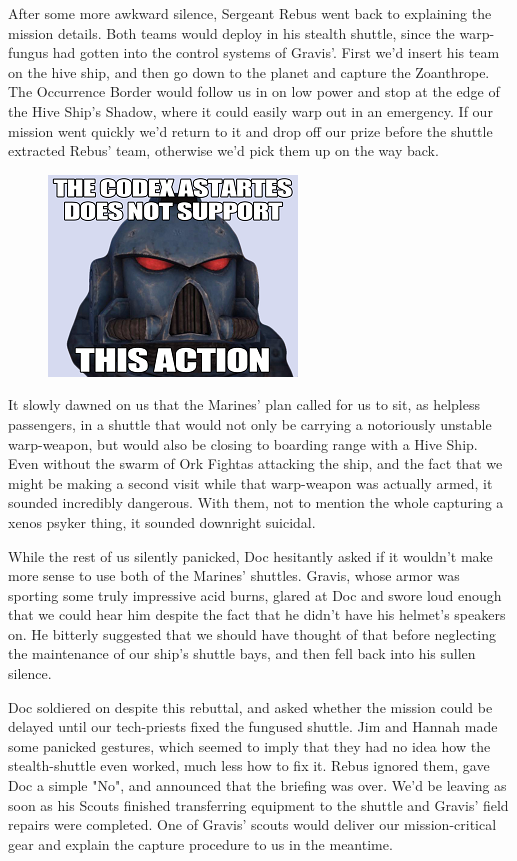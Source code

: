 After some more awkward silence, Sergeant Rebus went back to explaining the mission details. 
Both teams would deploy in his stealth shuttle, since the warp-fungus had gotten into the control systems of Gravis'. 
First we'd insert his team on the hive ship, and then go down to the planet and capture the Zoanthrope. 
The Occurrence Border would follow us in on low power and stop at the edge of the Hive Ship's Shadow, where it could easily warp out in an emergency. 
If our mission went quickly we'd return to it and drop off our prize before the shuttle extracted  Rebus' team, otherwise we'd pick them up on the way back.
\begin{figure}
	\begin{center}
		\includegraphics[width=\figwidth]{pics/12/22.png}
	\end{center}
\end{figure}
It slowly dawned on us that the Marines' plan called for us to sit, as helpless passengers, in a shuttle that would not only be carrying a notoriously unstable warp-weapon, but would also be closing to boarding range with a Hive Ship. 
Even without the swarm of Ork Fightas attacking the ship, and the fact that we might be making a second visit while that warp-weapon was actually armed, it sounded incredibly dangerous. 
With them, not to mention the whole capturing a xenos psyker thing, it sounded downright suicidal.

While the rest of us silently panicked, Doc hesitantly asked if it wouldn't make more sense to use both of the Marines' shuttles. 
Gravis, whose armor was sporting some truly impressive acid burns, glared at Doc and swore loud enough that we could hear him despite the fact that he didn't have his helmet's speakers on. 
He bitterly suggested that we should have thought of that before neglecting the maintenance of our ship's shuttle bays, and then fell back into his sullen silence. 


Doc soldiered on despite this rebuttal, and asked whether the mission could be delayed until our tech-priests fixed the fungused shuttle. 
Jim and Hannah made some panicked gestures, which seemed to imply that they had no idea how the stealth-shuttle even worked, much less how to fix it. 
Rebus ignored them, gave Doc a simple "No", and announced that the briefing was over. 
We'd be leaving as soon as his Scouts finished transferring equipment to the shuttle and Gravis' field repairs were completed. 
One of Gravis' scouts would deliver our mission-critical gear and explain the capture procedure to us in the meantime.

